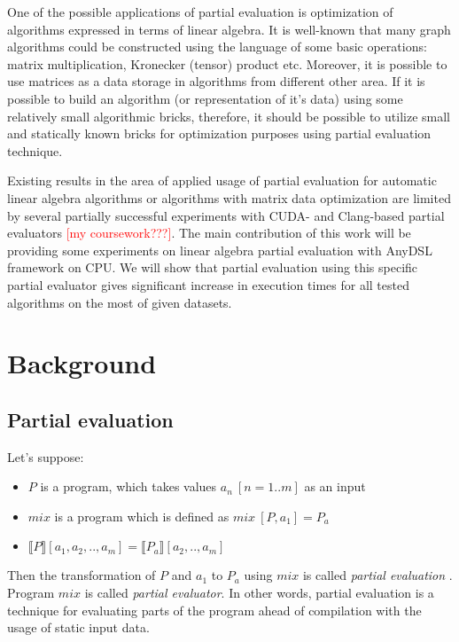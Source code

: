 \documentclass[conference]{IEEEtran}
\begin{document}
One of the possible applications of partial evaluation is optimization of algorithms expressed in terms of linear algebra. It is well-known \cite{kepner2011graph} that many graph algorithms could be constructed using the language of some basic operations: matrix multiplication, Kronecker (tensor) product etc. Moreover, it is possible to use matrices as a data storage in algorithms from different other area. If it is possible to build an algorithm (or representation of it's data) using some relatively small algorithmic bricks, therefore, it should be possible to utilize small and statically known bricks for optimization purposes using partial evaluation technique.

Existing results in the area of applied usage of partial evaluation for automatic linear algebra algorithms or algorithms with matrix data optimization are limited by several partially successful experiments with CUDA- and Clang-based partial evaluators \cite{tyurin2020optimizing} \textcolor{red}{[my coursework???]}. The main contribution of this work  will be providing some experiments on linear algebra partial evaluation with AnyDSL \cite{leissa2018anydsl} framework on CPU. We will show that partial evaluation using this specific partial evaluator gives significant increase in execution times for all tested algorithms on the most of given datasets.


\section{Background}

\subsection{Partial evaluation}

Let's suppose:

\begin{itemize}
	\item $P$ is a program, which takes values $a_n\ [n=1..m]$ as an input
	\item $mix$ is a program which is defined as $mix\ [P, a_1] = P_a$
	\item $\llbracket P \rrbracket [a_1, a_2, .., a_m] = \llbracket P_a \rrbracket [a_2, .., a_m]$
\end{itemize}
Then the transformation of $P$ and $a_1$ to $P_a$ using $mix$ is called \textit{partial evaluation} \cite{jones1993partial}. Program $mix$ is called \textit{partial evaluator}. In other words, partial evaluation is a technique for evaluating parts of the program ahead of compilation with the usage of static input data.
\end{document}
